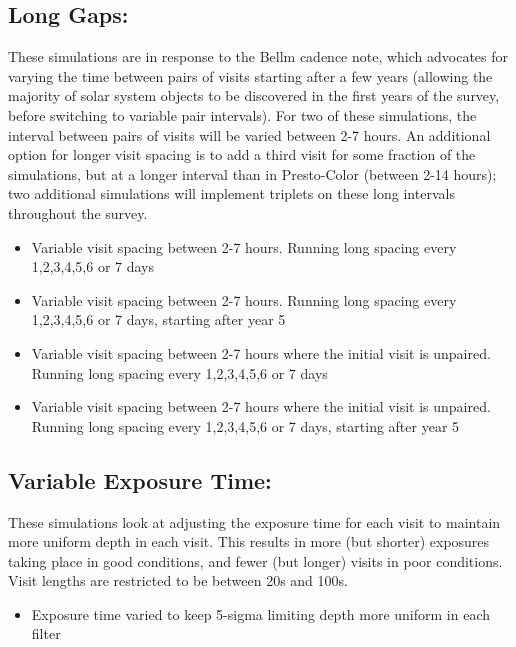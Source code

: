 \subsection{Long Gaps:}
These simulations are in response to the Bellm cadence note, which advocates for varying the time between pairs of visits starting after a few years (allowing the majority of solar system objects to be discovered in the first years of the survey, before switching to variable pair intervals). For two of these simulations, the interval between pairs of visits will be varied between 2-7 hours. An additional option for longer visit spacing is to add a third visit for some fraction of the simulations, but at a longer interval than in Presto-Color (between 2-14 hours); two additional simulations will implement triplets on these long intervals throughout the survey.
\begin{itemize}
\item Variable visit spacing between 2-7 hours. Running long spacing every 1,2,3,4,5,6 or 7 days
\item Variable visit spacing between 2-7 hours. Running long spacing every 1,2,3,4,5,6 or 7 days, starting after year 5
\item Variable visit spacing between 2-7 hours where the initial visit is unpaired. Running long spacing every 1,2,3,4,5,6 or 7 days
\item Variable visit spacing between 2-7 hours where the initial visit is unpaired. Running long spacing every 1,2,3,4,5,6 or 7 days, starting after year 5 
\end{itemize}

\subsection{Variable Exposure Time:}
These simulations look at adjusting the exposure time for each visit to maintain more uniform depth in each visit. This results in more (but shorter) exposures taking place in good conditions, and fewer (but longer) visits in poor conditions. Visit lengths are restricted to be between 20s and 100s. 
\begin{itemize}
\item Exposure time varied to keep 5-sigma limiting depth more uniform in each filter
\end{itemize}

